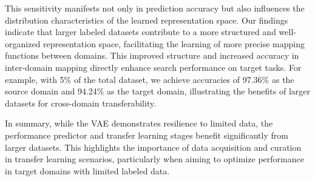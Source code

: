 \documentclass[../main.tex]{subfiles}
\begin{document}
This sensitivity manifests not only in prediction accuracy but also influences the distribution characteristics of the learned representation space.
Our findings indicate that larger labeled datasets contribute to a more structured and well-organized representation space, facilitating the learning of more precise mapping functions between domains. This improved structure and increased accuracy in inter-domain mapping directly enhance search performance on target tasks.
For example, with 5\% of the total dataset, we achieve accuracies of 97.36\% as the source domain and 94.24\% as the target domain, illustrating the benefits of larger datasets for cross-domain transferability.

In summary, while the VAE demonstrates resilience to limited data, the performance predictor and transfer learning stages benefit significantly from larger datasets. This highlights the importance of data acquisition and curation in transfer learning scenarios, particularly when aiming to optimize performance in target domains with limited labeled data.
\end{document}

